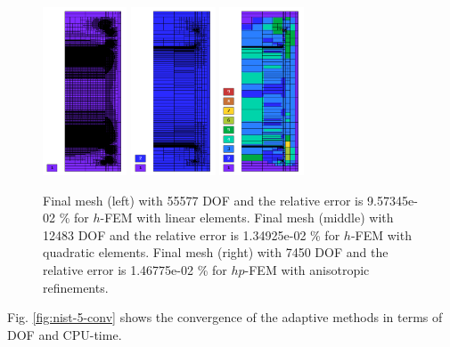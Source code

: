 \documentclass[12pt]{elsarticle}
\begin{document}
\begin{figure}[H]
\centering
\includegraphics[height=5cm]{nist/nist-5/mesh_h1_aniso.png}
\includegraphics[height=5cm]{nist/nist-5/mesh_h2_aniso.png}
\includegraphics[height=5cm]{nist/nist-5/mesh_hp_aniso.png}
\caption{
Final mesh (left) with 55577 DOF and the relative error is 9.57345e-02 \% for $h$-FEM with linear elements.
Final mesh (middle) with 12483 DOF and the relative error is 1.34925e-02 \% for $h$-FEM with quadratic elements.
Final mesh (right) with 7450 DOF and the relative error is 1.46775e-02 \% for $hp$-FEM with anisotropic refinements.}
\label{fig:nist-5-hp-aniso}
\end{figure}

Fig. \ref{fig:nist-5-conv} shows the convergence of the adaptive methods in terms of DOF and CPU-time.
\end{document}

